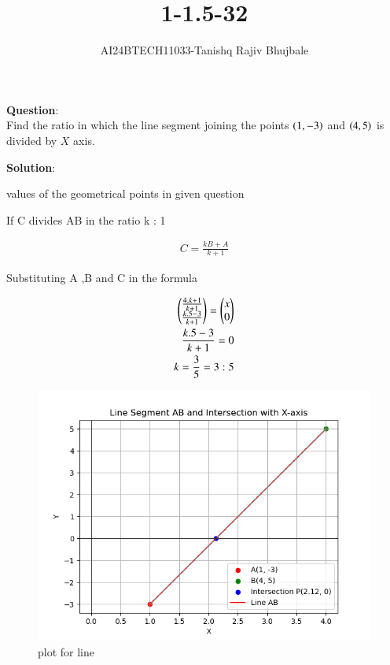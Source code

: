 \documentclass[journal]{IEEEtran}
\begin{document}

\vspace{3cm}

\title{1-1.5-32}
\author{AI24BTECH11033-Tanishq Rajiv Bhujbale}
{\let\newpage\relax\maketitle}

\renewcommand{\thefigure}{\theenumi}
\renewcommand{\thetable}{\theenumi}
\setlength{\intextsep}{10pt} %


\renewcommand{\thetable}{\theenumi}


\textbf{Question}:\\
Find the ratio in which the line segment joining the points $\left(1,-3\right)$ and $\left(4, 5\right)$ is divided by $X$ axis.

\textbf{Solution}:\\

\renewcommand{\tablename}{TABLE 1}
\begin{table}[h!]    
  \centering
  
  \caption{values of the geometrical points in given question}
  \label{tab1-1.2-18-1}
\end{table}


If C divides AB in the ratio k : 1


\begin{align}
C=\frac{kB+A}{k+1}
\end{align}

  Substituting A ,B and C in the formula 
  
 \begin{align} 
 \begin{pmatrix} \frac{4.k+1}{k+1}\\ \frac{k.5-3}{k+1}\end{pmatrix} = \begin{pmatrix} x \\ 0\end{pmatrix} \\	 
 \frac{k.5-3}{k+1} = 0 \\
 k=\frac{3}{5}=3:5 
\end{align}

\begin{figure}[h!]
   \centering
   \includegraphics[width=0.7\linewidth]{figs/Figure_1.png}
   \caption{plot for line}
   \label{fig. 1-1.5-32}
\end{figure}
\end{document}
